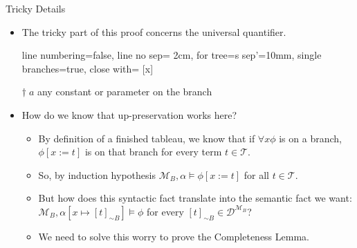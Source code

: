 \begin{frame}{Tricky Details}

	\begin{itemize}%
	\itemsep=16pt
		
	\item The tricky part of this proof concerns the universal quantifier.

	\begin{center}

			\begin{prooftree}
			{
			line numbering=false,
			line no sep= 2cm,
			for tree={s sep'=10mm},
			single branches=true,
			close with=\xmark
			}
			[\forall x\phi [\phi\lbrack x:\!{=}\, a\rbrack^\dagger ] ]
			\end{prooftree}

	$\dagger\; a$ any constant or parameter on the branch

	\end{center}

	\item How do we know that up-preservation works here?

		\begin{itemize}%
		\item By definition of a finished tableau, we know that if $\forall x\phi$ is on a branch, $\phi[x:=t]$ is on that branch for every term $t\in\mathcal{T}$.
		\item So, by induction hypothesis $\mathcal{M}_B,\alpha\vDash\phi[x:=t]$ for all $t\in\mathcal{T}$.
		\item But how does this syntactic fact translate into the semantic fact we want:
		$\mathcal{M}_B,\alpha[x\mapsto[t]_{\sim B}]\vDash\phi$ for every $[t]_{\sim B}\in\mathcal{D}^{\mathcal{M}_B}$?
		\item We need to solve this worry to prove the Completeness Lemma.
		\end{itemize}

	\end{itemize}

\end{frame}

